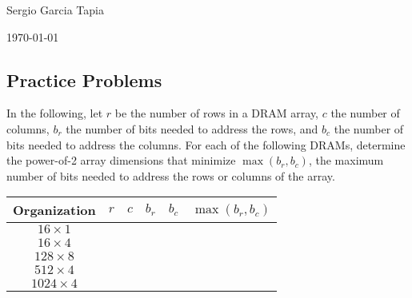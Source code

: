 \documentclass[12pt]{article}
\newenvironment{ex}[2][Exercise]{\begin{trivlist}
		\item[\hskip \labelsep {\bfseries #1}\hskip \labelsep {\bfseries #2.}]}{\end{trivlist}}
\begin{document}

\noindent Sergio Garcia Tapia \hfill

 \hfill

\noindent\today

\subsection*{Practice Problems}

\begin{ex}{6.1}
	In the following, let $r$ be the number of rows in a DRAM array, $c$ the number of columns,
	$b_r$ the number of bits needed to address the rows, and $b_c$ the number of bits needed to
	address the columns. For each of the following DRAMs, determine the power-of-2 array dimensions
	that minimize $\max(b_r, b_c)$, the maximum number of bits needed to address the rows or
	columns of the array.
	\begin{center}
		\begin{tabular}{cccccc}
			Organization & $r$ & $c$ & $b_r$ & $b_c$ & $\max(b_r, b_c)$\\
			\hline
			$16\times 1$ & \makebox[1cm]{\hrulefill} & \makebox[1cm]{\hrulefill} & \makebox[1cm]{\hrulefill} & \makebox[1cm]{\hrulefill} & \makebox[1cm]{\hrulefill}\\
			$16\times 4$ & \makebox[1cm]{\hrulefill} & \makebox[1cm]{\hrulefill} & \makebox[1cm]{\hrulefill} & \makebox[1cm]{\hrulefill} & \makebox[1cm]{\hrulefill}\\
			$128\times 8$ & \makebox[1cm]{\hrulefill} & \makebox[1cm]{\hrulefill} & \makebox[1cm]{\hrulefill} & \makebox[1cm]{\hrulefill} & \makebox[1cm]{\hrulefill}\\
			$512\times 4$ & \makebox[1cm]{\hrulefill} & \makebox[1cm]{\hrulefill} & \makebox[1cm]{\hrulefill} & \makebox[1cm]{\hrulefill} & \makebox[1cm]{\hrulefill}\\
			$1024\times 4$ & \makebox[1cm]{\hrulefill} & \makebox[1cm]{\hrulefill} & \makebox[1cm]{\hrulefill} & \makebox[1cm]{\hrulefill} & \makebox[1cm]{\hrulefill}\\
		\end{tabular}
	\end{center}
\end{ex}
\end{document}
